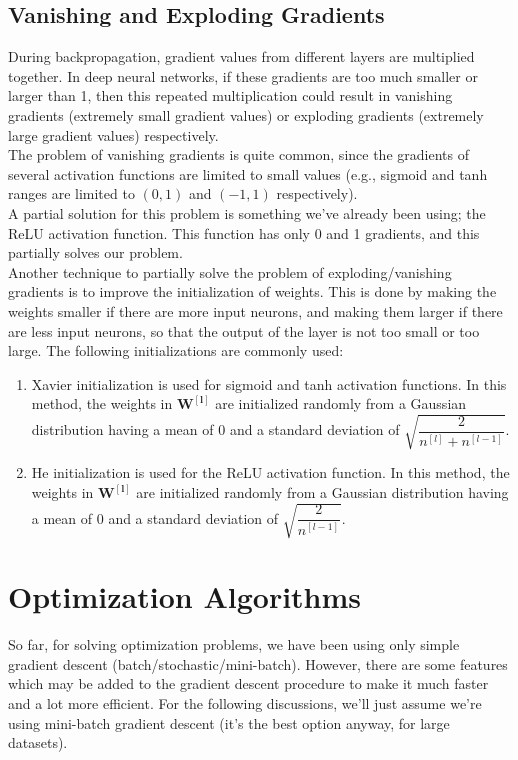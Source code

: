 \documentclass[a4paper, 12pt]{report}
\begin{document}
\section{Vanishing and Exploding Gradients}
During backpropagation, gradient values from different layers are multiplied together. In deep neural networks, if these gradients are too much smaller or larger than 1, then this repeated multiplication could result in vanishing gradients (extremely small gradient values) or exploding gradients (extremely large gradient values) respectively.\\
\break
The problem of vanishing gradients is quite common, since the gradients of several activation functions are limited to small values (e.g., sigmoid and tanh ranges are limited to $(0, 1)$ and $(-1, 1)$ respectively).\\
\break
A partial solution for this problem is something we've already been using; the ReLU activation function. This function has only 0 and 1 gradients, and this partially solves our problem.\\
\break
Another technique to partially solve the problem of exploding/vanishing gradients is to improve the initialization of weights. This is done by making the weights smaller if there are more input neurons, and making them larger if there are less input neurons, so that the output of the layer is not too small or too large. The following initializations are commonly used:
\break
\begin{enumerate}
\item Xavier initialization is used for sigmoid and tanh activation functions. In this method, the weights in $\bm{W^{[l]}}$ are initialized randomly from a Gaussian distribution having a mean of 0 and a standard deviation of $\sqrt{\dfrac{2}{n^{[l]} + n^{[l-1]}}}$.
\item He initialization is used for the ReLU activation function. In this method, the weights in $\bm{W^{[l]}}$ are initialized randomly from a Gaussian distribution having a mean of 0 and a standard deviation of $\sqrt{\dfrac{2}{n^{[l-1]}}}$.
\end{enumerate}

\newpage

\chapter{Optimization Algorithms}
So far, for solving optimization problems, we have been using only simple gradient descent (batch/stochastic/mini-batch). However, there are some features which may be added to the gradient descent procedure to make it much faster and a lot more efficient. For the following discussions, we'll just assume we're using mini-batch gradient descent (it's the best option anyway, for large datasets).
\end{document}
